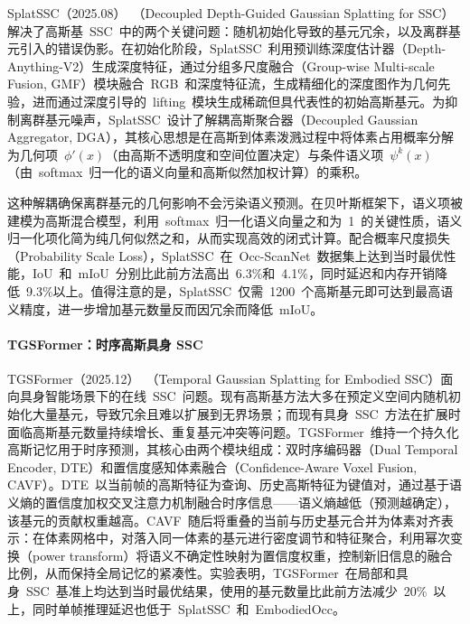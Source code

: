 SplatSSC（2025.08）~\cite{2508_02261}（Decoupled Depth-Guided Gaussian Splatting for SSC）解决了高斯基~SSC~中的两个关键问题：随机初始化导致的基元冗余，以及离群基元引入的错误伪影。在初始化阶段，SplatSSC~利用预训练深度估计器（Depth-Anything-V2）生成深度特征，通过分组多尺度融合（Group-wise Multi-scale Fusion, GMF）模块融合~RGB~和深度特征流，生成精细化的深度图作为几何先验，进而通过深度引导的~lifting~模块生成稀疏但具代表性的初始高斯基元。为抑制离群基元噪声，SplatSSC~设计了解耦高斯聚合器（Decoupled Gaussian Aggregator, DGA），其核心思想是在高斯到体素泼溅过程中将体素占用概率分解为几何项~$\phi'(x)$（由高斯不透明度和空间位置决定）与条件语义项~$\psi^k(x)$（由~softmax~归一化的语义向量和高斯似然加权计算）的乘积。

这种解耦确保离群基元的几何影响不会污染语义预测。在贝叶斯框架下，语义项被建模为高斯混合模型，利用~softmax~归一化语义向量之和为~1~的关键性质，语义归一化项化简为纯几何似然之和，从而实现高效的闭式计算。配合概率尺度损失（Probability Scale Loss），SplatSSC~在~Occ-ScanNet~数据集上达到当时最优性能，IoU~和~mIoU~分别比此前方法高出~6.3\%和~4.1\%，同时延迟和内存开销降低~9.3\%以上。值得注意的是，SplatSSC~仅需~1200~个高斯基元即可达到最高语义精度，进一步增加基元数量反而因冗余而降低~mIoU。

\paragraph{TGSFormer：时序高斯具身 SSC} TGSFormer（2025.12）~\cite{2512_00300}（Temporal Gaussian Splatting for Embodied SSC）面向具身智能场景下的在线~SSC~问题。现有高斯基方法大多在预定义空间内随机初始化大量基元，导致冗余且难以扩展到无界场景；而现有具身~SSC~方法在扩展时面临高斯基元数量持续增长、重复基元冲突等问题。TGSFormer~维持一个持久化高斯记忆用于时序预测，其核心由两个模块组成：双时序编码器（Dual Temporal Encoder, DTE）和置信度感知体素融合（Confidence-Aware Voxel Fusion, CAVF）。DTE~以当前帧的高斯特征为查询、历史高斯特征为键值对，通过基于语义熵的置信度加权交叉注意力机制融合时序信息——语义熵越低（预测越确定），该基元的贡献权重越高。CAVF~随后将重叠的当前与历史基元合并为体素对齐表示：在体素网格中，对落入同一体素的基元进行密度调节和特征聚合，利用幂次变换（power transform）将语义不确定性映射为置信度权重，控制新旧信息的融合比例，从而保持全局记忆的紧凑性。实验表明，TGSFormer~在局部和具身~SSC~基准上均达到当时最优结果，使用的基元数量比此前方法减少~20\%~以上，同时单帧推理延迟也低于~SplatSSC~和~EmbodiedOcc。

